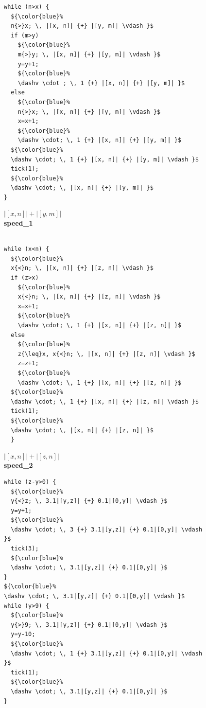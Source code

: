 \documentclass[nocopyrightspace,preprint]{sigplanconf}
\begin{document}
\begin{figure}[t!]
 \setlength{\progwidth}{.22\linewidth}
  \centering
\hspace{-0.4cm}
  \begin{minipage}[b]{.18\linewidth}
    \begin{center}
   \begin{lstlisting}[]
while (n>x) {
  ${\color{blue}%
  n{>}x; \, |[x, n]| {+} |[y, m]| \vdash }$
  if (m>y)
    ${\color{blue}%
    m{>}y; \, |[x, n]| {+} |[y, m]| \vdash }$
    y=y+1;
    ${\color{blue}%
    \dashv \cdot ; \, 1 {+} |[x, n]| {+} |[y, m]| }$
  else
    ${\color{blue}%
    n{>}x; \, |[x, n]| {+} |[y, m]| \vdash }$
    x=x+1;
    ${\color{blue}%
    \dashv \cdot; \, 1 {+} |[x, n]| {+} |[y, m]| }$
  ${\color{blue}%
  \dashv \cdot; \, 1 {+} |[x, n]| {+} |[y, m]| \vdash }$
  tick(1);
  ${\color{blue}%
  \dashv \cdot; \, |[x, n]| {+} |[y, m]| }$
}
   \end{lstlisting}

$|[x, n]| + |[y, m]|$
\\[.4\baselineskip]
      {\bf speed\_1}
    \end{center}
  \end{minipage}
%
\hfill
%
  \begin{minipage}[b]{\progwidth}
    \begin{center}
   \begin{lstlisting}

while (x<n) {
  ${\color{blue}%
  x{<}n; \, |[x, n]| {+} |[z, n]| \vdash }$
  if (z>x)
    ${\color{blue}%
    x{<}n; \, |[x, n]| {+} |[z, n]| \vdash }$
    x=x+1;
    ${\color{blue}%
    \dashv \cdot; \, 1 {+} |[x, n]| {+} |[z, n]| }$
  else
    ${\color{blue}%
    z{\leq}x, x{<}n; \, |[x, n]| {+} |[z, n]| \vdash }$
    z=z+1;
    ${\color{blue}%
    \dashv \cdot; \, 1 {+} |[x, n]| {+} |[z, n]| }$
  ${\color{blue}%
  \dashv \cdot; \, 1 {+} |[x, n]| {+} |[z, n]| \vdash }$
  tick(1);
  ${\color{blue}%
  \dashv \cdot; \, |[x, n]| {+} |[z, n]| }$
  }
   \end{lstlisting}

$|[x, n]| + |[z, n]|$
\\[.4\baselineskip]
      {\bf speed\_2}
    \end{center}
  \end{minipage}
%
\hfill
%
  \begin{minipage}[b]{\progwidth}
    \begin{center}
   \begin{lstlisting}
while (z-y>0) {
  ${\color{blue}%
  y{<}z; \, 3.1|[y,z]| {+} 0.1|[0,y]| \vdash }$
  y=y+1;
  ${\color{blue}%
  \dashv \cdot; \, 3 {+} 3.1|[y,z]| {+} 0.1|[0,y]| \vdash }$
  tick(3);
  ${\color{blue}%
  \dashv \cdot; \, 3.1|[y,z]| {+} 0.1|[0,y]| }$
}
${\color{blue}%
\dashv \cdot; \, 3.1|[y,z]| {+} 0.1|[0,y]| \vdash }$
while (y>9) {
  ${\color{blue}%
  y{>}9; \, 3.1|[y,z]| {+} 0.1|[0,y]| \vdash }$
  y=y-10;
  ${\color{blue}%
  \dashv \cdot; \, 1 {+} 3.1|[y,z]| {+} 0.1|[0,y]| \vdash }$
  tick(1);
  ${\color{blue}%
  \dashv \cdot; \, 3.1|[y,z]| {+} 0.1|[0,y]| }$
}
   \end{lstlisting}


\end{center}
\end{minipage}
\end{figure}
\end{document}
